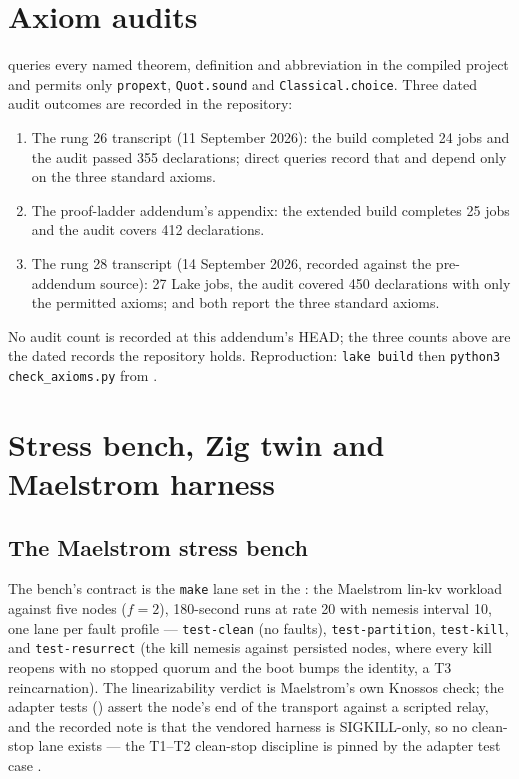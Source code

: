 \documentclass[10pt,journal,letterpaper]{IEEEtran}
\newcommand{\code}[1]{\texttt{#1}}
\begin{document}
\section{Axiom audits}\label{sec:axioms}
 queries every named theorem,
definition and abbreviation in the compiled project and permits only
\code{propext}, \code{Quot.sound} and \code{Classical.choice}. Three dated
audit outcomes are recorded in the repository:
\begin{enumerate}
\item The rung 26 transcript (11 September 2026): the build completed 24 jobs
and the audit passed 355 declarations; direct queries record that
 and
 depend only on the three
standard axioms.
\item The proof-ladder addendum's appendix: the extended build completes 25
jobs and the audit covers 412 declarations.
\item The rung 28 transcript (14 September 2026, recorded against the
pre-addendum source): 27 Lake jobs, the audit covered 450 declarations with
only the permitted axioms;  and
 both report the three standard axioms.
\end{enumerate}
No audit count is recorded at this addendum's HEAD; the three counts above
are the dated records the repository holds. Reproduction: \code{lake build}
then \code{python3 check\_axioms.py} from .

\section{Stress bench, Zig twin and Maelstrom harness}\label{sec:bench}
\subsection{The Maelstrom stress bench}
The bench's contract is the \code{make} lane set in the : the
Maelstrom lin-kv workload against five nodes ($f=2$), 180-second runs at
rate 20 with nemesis interval 10, one lane per fault profile ---
\code{test-clean} (no faults), \code{test-partition},
\code{test-kill}, and \code{test-resurrect} (the kill nemesis against
persisted nodes, where every kill reopens with no stopped quorum and the boot
bumps the identity, a T3 reincarnation). The linearizability verdict is
Maelstrom's own Knossos check; the adapter tests
() assert the node's end of the transport
against a scripted relay, and the recorded note is that the vendored harness
is SIGKILL-only, so no clean-stop lane exists --- the T1--T2 clean-stop
discipline is pinned by the adapter test
 case
.
\end{document}
